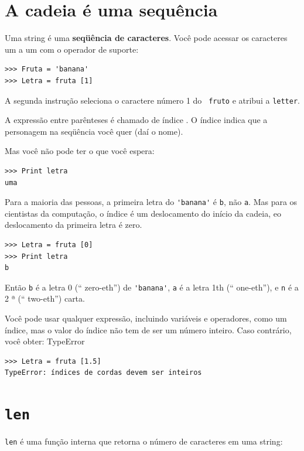 \documentclass[10pt]{book}
\begin{document}
{\section{A cadeia é uma sequência}

Uma string é uma {\bf seqüência de caracteres}.  
Você pode acessar os caracteres um a um com o
operador de suporte:

\begin{verbatim}
>>> Fruta = 'banana'
>>> Letra = fruta [1]
\end{verbatim}
%
A segunda instrução seleciona o caractere número 1 do {\tt
fruto} e atribui a {\tt letter}.  

A expressão entre parênteses é chamado de índice {\bf}.  
O índice indica que a personagem na seqüência você
quer (daí o nome).

Mas você não pode ter o que você espera:

\begin{verbatim}
>>> Print letra
uma
\end{verbatim}
%
Para a maioria das pessoas, a primeira letra do \verb "'banana'" é {\tt b}, não
{\tt a}. Mas para os cientistas da computação, o índice é um deslocamento do
início da cadeia, eo deslocamento da primeira letra é zero.

\begin{verbatim}
>>> Letra = fruta [0]
>>> Print letra
b
\end{verbatim}
%
Então {\tt b} é a letra 0 (`` zero-eth'') de \verb "'banana'", {\tt a}
é a letra 1th (`` one-eth''), e {\tt n} é a 2 ª (`` two-eth'')
carta.

Você pode usar qualquer expressão, incluindo variáveis ​​e operadores, como um
índice, mas o valor do índice não tem de ser um número inteiro. Caso contrário, você
obter:
\index{} TypeError

\begin{verbatim}
>>> Letra = fruta [1.5]
TypeError: índices de cordas devem ser inteiros
\end{verbatim}
%

\section{{\tt len}}

{\tt len} é uma função interna que retorna o número de caracteres
em uma string:

}
\end{document}
